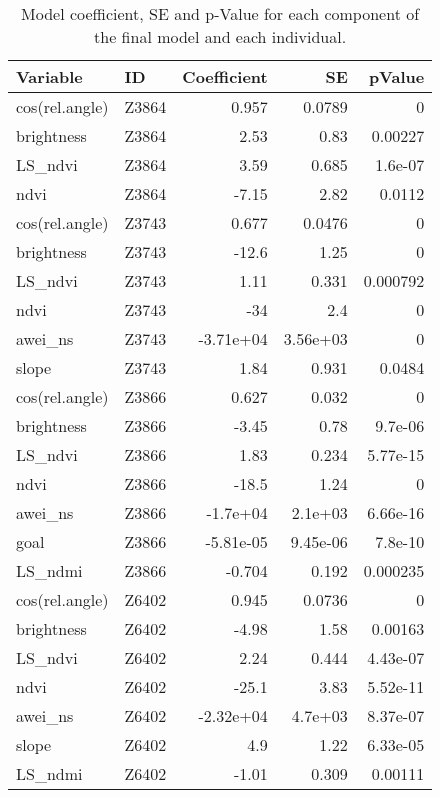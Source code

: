 \begin{table}[H]
\centering
\caption[Model summary for each variable and each individual]{Model coefficient, SE and p-Value for each component of the 
             final model and each individual.} 
\label{table:summary_model_BWA}
\begin{tabular}{llrrr}
  \hline
Variable & ID & Coefficient & SE & pValue \\ 
  \hline
cos(rel.angle) & Z3864 & 0.957 & 0.0789 &    0 \\ 
  brightness & Z3864 & 2.53 & 0.83 & 0.00227 \\ 
  LS\_ndvi & Z3864 & 3.59 & 0.685 & 1.6e-07 \\ 
  ndvi & Z3864 & -7.15 & 2.82 & 0.0112 \\ 
  cos(rel.angle) & Z3743 & 0.677 & 0.0476 &    0 \\ 
  brightness & Z3743 & -12.6 & 1.25 &    0 \\ 
  LS\_ndvi & Z3743 & 1.11 & 0.331 & 0.000792 \\ 
  ndvi & Z3743 &  -34 &  2.4 &    0 \\ 
  awei\_ns & Z3743 & -3.71e+04 & 3.56e+03 &    0 \\ 
  slope & Z3743 & 1.84 & 0.931 & 0.0484 \\ 
  cos(rel.angle) & Z3866 & 0.627 & 0.032 &    0 \\ 
  brightness & Z3866 & -3.45 & 0.78 & 9.7e-06 \\ 
  LS\_ndvi & Z3866 & 1.83 & 0.234 & 5.77e-15 \\ 
  ndvi & Z3866 & -18.5 & 1.24 &    0 \\ 
  awei\_ns & Z3866 & -1.7e+04 & 2.1e+03 & 6.66e-16 \\ 
  goal & Z3866 & -5.81e-05 & 9.45e-06 & 7.8e-10 \\ 
  LS\_ndmi & Z3866 & -0.704 & 0.192 & 0.000235 \\ 
  cos(rel.angle) & Z6402 & 0.945 & 0.0736 &    0 \\ 
  brightness & Z6402 & -4.98 & 1.58 & 0.00163 \\ 
  LS\_ndvi & Z6402 & 2.24 & 0.444 & 4.43e-07 \\ 
  ndvi & Z6402 & -25.1 & 3.83 & 5.52e-11 \\ 
  awei\_ns & Z6402 & -2.32e+04 & 4.7e+03 & 8.37e-07 \\ 
  slope & Z6402 &  4.9 & 1.22 & 6.33e-05 \\ 
  LS\_ndmi & Z6402 & -1.01 & 0.309 & 0.00111 \\ 

\end{tabular}
\end{table}
